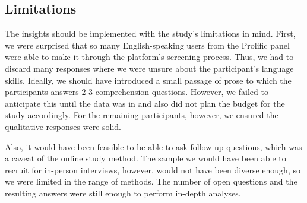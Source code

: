 \subsection{Limitations}
The insights should be implemented with the study's limitations in mind. First, we were surprised that so many English-speaking users from the Prolific panel were able to make it through the platform's screening process. Thus, we had to discard many responses where we were unsure about the participant's language skills. Ideally, we should have introduced a small passage of prose to which the participants answers 2-3 comprehension questions. However, we failed to anticipate this until the data was in and also did not plan the budget for the study accordingly. For the remaining participants, however, we ensured the qualitative responses were solid. 

Also, it would have been feasible to be able to ask follow up questions, which was a caveat of the online study method. The sample we would have been able to recruit for in-person interviews, however, would not have been diverse enough, so we were limited in the range of methods. The number of open questions and the resulting answers were still enough to perform in-depth analyses. %


%
		
